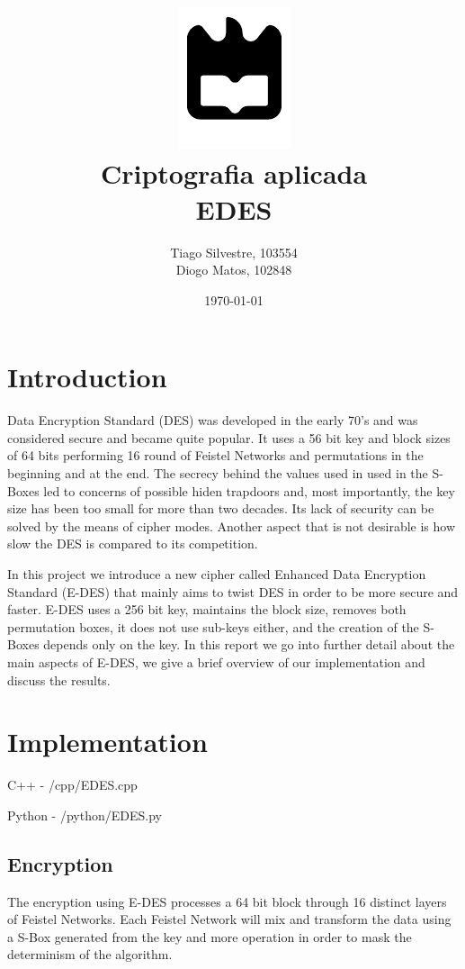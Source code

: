 \documentclass{article} %
\title{%
    \includegraphics[width=0.3\linewidth]{./assets/logo.pdf}\\[20pt]
    \Huge \bfseries Criptografia aplicada \\[10pt]
    \Large EDES
}
\author{Tiago Silvestre, 103554 \\ Diogo Matos, 102848}
\date{\today}
\begin{document}
\maketitle

\newpage

\tableofcontents

\clearpage

\section{Introduction}
Data Encryption Standard (DES) was developed in the early 70's and was considered secure and became quite popular. It uses a 56 bit key and block sizes of 64 bits performing 
16 round of Feistel Networks and permutations in the beginning and at the end. The secrecy behind the values used in used in the S-Boxes led to concerns of possible
hiden trapdoors and, most importantly, the key size has been too small for more than two decades. Its lack of security can be solved by the means of cipher modes. Another
aspect that is not desirable is how slow the DES is compared to its competition.

In this project we introduce a new cipher called Enhanced Data Encryption Standard (E-DES) that mainly aims to twist DES in order to be more secure and faster. 
E-DES uses a 256 bit key, maintains the block size, removes both permutation boxes, it does not use sub-keys either, and the creation of the S-Boxes depends only on the key. In this report we go into 
further detail about the main aspects of E-DES, we give a brief overview of our implementation and discuss the results.

\section{Implementation}
\begin{tcolorbox}
  [width=\linewidth, colback=white!95!black, boxrule=0pt]
  C++    - /cpp/EDES.cpp

  Python - /python/EDES.py
\end{tcolorbox}


\subsection{Encryption}
The encryption using E-DES processes a 64 bit block through 16 distinct layers of Feistel Networks. 
Each Feistel Network will mix and transform the data using a S-Box generated from the key and more
operation in order to mask the determinism of the algorithm. 
\end{document}
